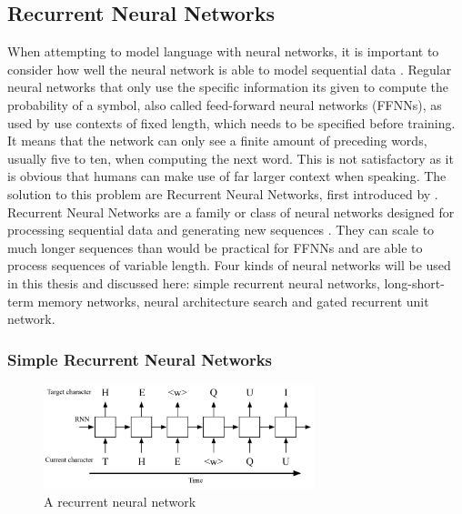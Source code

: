 \documentclass[11pt,a4paper,twoside,openright]{scrbook}
\begin{document}
\subsection{Recurrent Neural Networks}
\label{section:NNs}
When attempting to model language with neural networks, it is important to consider how well the neural network is able to model sequential data \cite{mikolov}. Regular neural networks that only use the specific information its given to compute the probability of a symbol, also called feed-forward neural networks (FFNNs), as used by \cite{bengio} use contexts of fixed length, which needs to be specified before training. It means that the network can only see a finite amount of preceding words, usually five to ten, when computing the next word. This is not satisfactory as it is obvious that humans can make use of far larger context when speaking.
The solution to this problem are Recurrent Neural Networks, first introduced by \cite{elman}. Recurrent Neural Networks are a family or class of neural networks designed for processing sequential data and generating new sequences \cite{goodfellow}. They can scale to much longer sequences than would be practical for FFNNs and are able to process sequences of variable length. Four kinds of neural networks will be used in this thesis and discussed here: simple recurrent neural networks, long-short-term memory networks, neural architecture search and gated recurrent unit network.

\subsubsection{Simple Recurrent Neural Networks}

\begin{figure}
\centering
\includegraphics[width=0.7\textwidth]{images/hwan_char_rnn.png}
\caption{A recurrent neural network \cite{hwang}}
\label{Figure:RNN}
\end{figure}
\end{document}
